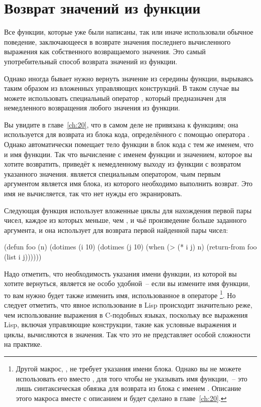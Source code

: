 \section{Возврат значений из функции}

Все функции, которые уже были написаны, так или иначе использовали обычное поведение,
заключающееся в возврате значения последнего вычисленного выражения как собственного
возвращаемого значения.  Это самый употребительный способ возврата значений из функции.

Однако иногда бывает нужно вернуть значение из середины функции, вырываясь таким образом
из вложенных управляющих конструкций.  В таком случае вы можете использовать специальный
оператор , который предназначен для немедленного возвращения любого
значения из функции.

Вы увидите в главе~\ref{ch:20}, что  в самом деле не привязана к функциям; она
используется для возврата из блока кода, определённого с помощью оператора .
Однако  автоматически помещает тело функции в блок кода с тем же именем, что и
имя функции.  Так что вычисление  с именем функции и значением, которое вы
хотите возвратить, приведёт к немедленному выходу из функции с возвратом указанного
значения.   является специальным оператором, чьим первым аргументом
является имя блока, из которого необходимо выполнить возврат.  Это имя не вычисляется, так
что нет нужды его экранировать.

Следующая функция использует вложенные циклы для нахождения первой пары чисел, каждое из
которых меньше, чем , и чьё произведение больше заданного аргумента, и она использует
 для возврата первой найденной пары чисел:

\begin{myverb}
  (defun foo (n)
    (dotimes (i 10)
      (dotimes (j 10)
        (when (> (* i j) n)
          (return-from foo (list i j))))))
\end{myverb}

Надо отметить, что необходимость указания имени функции, из которой вы хотите вернуться,
является не особо удобной~-- если вы измените имя функции, то вам нужно будет также
изменить имя, использованное в операторе \footnote{Другой макрос,
  , не требует указания имени блока.  Однако вы не можете использовать его
  вместо , для того чтобы не указывать имя функции,~-- это лишь
  синтаксическая обвязка для возврата из блока с именем .  Описание этого
  макроса вместе с описанием  и  будет сделано в
  главе~\ref{ch:20}.}.  Но следует отметить, что явное использование
   в Lisp происходит значительно реже, чем использование
  выражения  в C-подобных языках, поскольку
все выражения Lisp, включая управляющие конструкции, такие как условные выражения и циклы,
вычисляются в значения.  Так что это не представляет особой сложности на практике.

